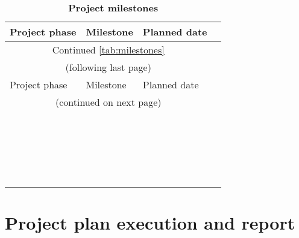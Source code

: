 \renewcommand\arraystretch{1.0}
\begin{longtable}{|m{4cm}<{\centering}|m{6cm}<{\centering}|m{4cm}<{\centering}|}
\caption{\textbf{Project milestones}}
\label{tab:milestones}\\
\toprule
Project phase & Milestone & Planned date \\
\midrule
\endfirsthead
\multicolumn{3}{c}{Continued \autoref{tab:milestones}}\\
\multicolumn{3}{c}{(following last page)}\\
\toprule
Project phase & Milestone & Planned date \\
\midrule
\endhead
\bottomrule
\multicolumn{3}{c}{(continued on next page)}
\endfoot
\bottomrule
\endlastfoot

\multirow{3}{*}{项目准备} &   &   \\
\cline{2-3}
                         &   &   \\
\cline{2-3}
                         &   &   \\
\cline{2-3}
                         &   &   \\
\midrule
   &   &   \\
\midrule
   &   &   \\
\midrule
   &   &   \\
\midrule
   &   &   \\
\midrule
   &   &   \\
\midrule
   &   &   \\
\midrule
   &   &   \\
\midrule
   &   &   \\
\midrule
   &   &   \\
\midrule
   &   &   \\
\midrule
   &   &   \\
\midrule
   &   &   \\
\midrule
   &   &   \\
\midrule
   &   &   \\
\midrule
   &   &   \\
\midrule
   &   &   \\
\midrule
   &   &   \\
\midrule
   &   &   \\

\end{longtable}

\section{Project plan execution and report}


